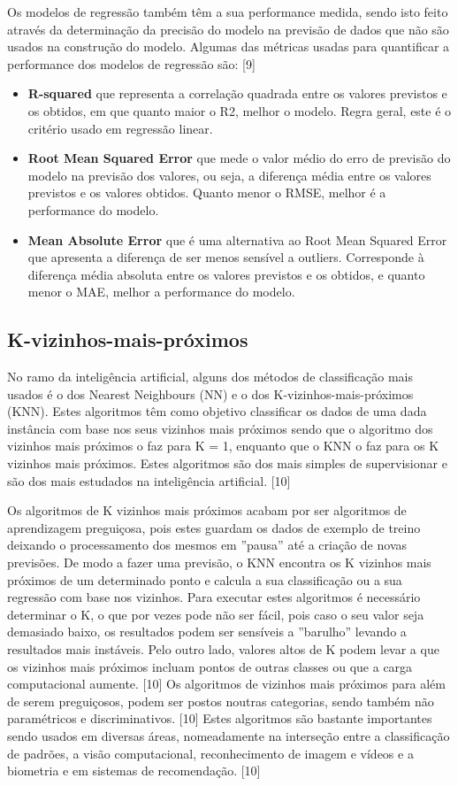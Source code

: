 Os modelos de regressão também têm a sua performance medida, sendo isto feito através da determinação da precisão do modelo na previsão de dados que não são usados na construção do modelo. Algumas das métricas usadas para quantificar a performance dos modelos de regressão são: [9]
\begin{itemize}
\item \textbf{R-squared} que representa a correlação quadrada entre os valores previstos e os obtidos, em que quanto maior o R2, melhor o modelo. Regra geral, este é o critério usado em regressão linear.

\item \textbf{Root Mean Squared Error} que mede o valor médio do erro de previsão do modelo na previsão dos valores, ou seja, a diferença média entre os valores previstos e os valores obtidos. Quanto menor o RMSE, melhor é a performance do modelo.

\item \textbf{Mean Absolute Error} que é uma alternativa ao Root Mean Squared Error que apresenta a diferença de ser menos sensível a outliers. Corresponde à diferença média absoluta entre os valores previstos e os obtidos, e quanto menor o MAE, melhor a performance do modelo.
\end{itemize}

\subsection{K-vizinhos-mais-próximos}
No ramo da inteligência artificial, alguns dos métodos de classificação mais usados é o dos Nearest Neighbours (NN) e o dos K-vizinhos-mais-próximos (KNN). Estes algoritmos têm como objetivo classificar os dados de uma dada instância com base nos seus vizinhos mais próximos sendo que o algoritmo dos vizinhos mais próximos o faz para K = 1, enquanto que o KNN o faz para os K vizinhos mais próximos. Estes algoritmos são dos mais simples de supervisionar e são dos mais estudados na inteligência artificial. [10]

Os algoritmos de K vizinhos mais próximos acabam por ser algoritmos de aprendizagem preguiçosa, pois estes guardam os dados de exemplo de treino deixando o processamento dos mesmos em ”pausa” até a criação de novas previsões. De modo a fazer uma previsão, o KNN encontra os K vizinhos mais próximos de um determinado ponto e calcula a sua classificação ou a sua regressão com base nos vizinhos. Para executar estes algoritmos é necessário determinar o K, o que por vezes pode não ser fácil, pois caso o seu valor seja demasiado baixo, os resultados podem ser sensíveis a ”barulho” levando a resultados mais instáveis. Pelo outro lado, valores altos de K podem levar a que os vizinhos mais próximos incluam pontos de outras classes ou que a carga computacional aumente. [10]
Os algoritmos de vizinhos mais próximos para além de serem preguiçosos, podem ser postos noutras categorias, sendo também não paramétricos e discriminativos. [10]
Estes algoritmos são bastante importantes sendo usados em diversas áreas, nomeadamente na interseção entre a classificação de padrões, a visão computacional, reconhecimento de imagem e vídeos e a biometria e em sistemas de recomendação. [10]
